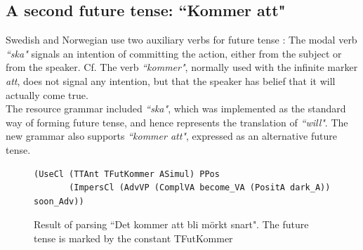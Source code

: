 \documentclass{report}
\begin{document}
\subsection{A second future tense: ``Kommer att"}
Swedish and Norwegian use two auxiliary verbs for future tense
\cite[p. 246]{H&H}:
The modal verb \emph{``ska"} signals an intention of committing the action, either from the subject or from
the speaker. Cf.
The verb \emph{``kommer"}, normally used with the infinite marker \emph{att},
does not signal any intention, but that the speaker has belief that 
it will actually come true.\\
The resource grammar included 
\emph{``ska"}, which was implemented as the standard way of forming future
tense, and hence represents the translation of
\emph{``will"}. 
The new grammar also supports \emph{``kommer att"}, expressed as an alternative
future tense.
\begin{figure}[h]
\begin{verbatim}
(UseCl (TTAnt TFutKommer ASimul) PPos 
       (ImpersCl (AdvVP (ComplVA become_VA (PositA dark_A)) soon_Adv))
\end{verbatim}
\caption{Result of parsing ``Det kommer att bli mörkt snart". The future tense
         is marked by the constant TFutKommer}
  \label{fig:kommeratt}
\end{figure}
\end{document}
